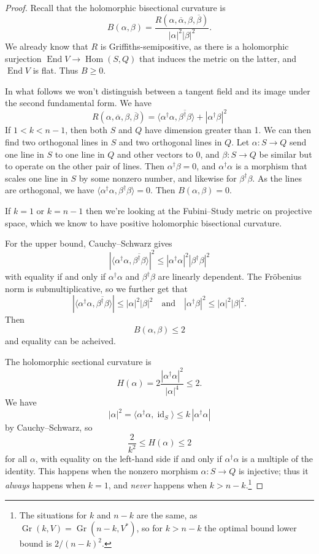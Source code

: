 \documentclass[10pt,a4paper]{article}
\newtheorem*{proof}{Proof}
\def\qandq{\quad\text{and}\quad}
\def\ov#1{\overline{#1}}
\DeclareMathOperator{\Gr}{Gr}
\DeclareMathOperator{\End}{End}
\DeclareMathOperator{\Hom}{Hom}
\DeclareMathOperator{\id}{id}
\begin{document}
\begin{proof}
Recall that the holomorphic bisectional curvature is
\[
B(\alpha,\beta)
= \frac{R(\alpha,\ov\alpha,\beta,\ov\beta)}{|\alpha|^2|\beta|^2}.
\]
We already know that $R$ is Griffiths-semipositive, as there is a holomorphic surjection $\End V \to \Hom(S,Q)$ that induces the metric on the latter, and $\End V$ is flat. Thus $B \geq 0$.

In what follows we won't distinguish between a tangent field and its image under the second fundamental form.
We have
\[
R(\alpha,\ov\alpha,\beta,\ov\beta)
= \langle \alpha^\dagger \alpha, \ov{\beta^\dagger \beta} \rangle
+ |\alpha^\dagger \beta|^2
\]
If $1 < k < n-1$, then both $S$ and $Q$ have dimension greater than 1.
We can then find two orthogonal lines in $S$ and two orthogonal lines
in $Q$. Let $\alpha : S \to Q$ send one line in $S$ to one line in $Q$
and other vectors to 0, and $\beta : S \to Q$ be similar but to
operate on the other pair of lines.
Then $\alpha^\dagger \beta = 0$, and $\alpha^\dagger \alpha$ is a morphism that scales one line in $S$ by some nonzero number, and likewise for $\beta^\dagger \beta$. As the lines are orthogonal, we have $\langle \alpha^\dagger \alpha, \beta^\dagger \beta \rangle = 0$. Then $B(\alpha,\beta) = 0$.

If $k = 1$ or $k = n-1$ then we're looking at the Fubini--Study metric on projective space, which we know to have positive holomorphic bisectional curvature.

For the upper bound,
Cauchy--Schwarz gives
\[
|\langle \alpha^\dagger \alpha, \ov{\beta^\dagger \beta} \rangle|^2
\leq
|\alpha^\dagger \alpha|^2 |\beta^\dagger \beta|^2
\]
with equality if and only if $\alpha^\dagger\alpha$ and $\beta^\dagger\beta$ are linearly dependent.
The Fr\"obenius norm is submultiplicative, so we further get that
\[
|\langle \alpha^\dagger \alpha, \ov{\beta^\dagger \beta} \rangle|
\leq |\alpha|^2 |\beta|^2
\qandq
|\alpha^\dagger \beta|^2
\leq |\alpha|^2 |\beta|^2.
\]
Then
\[
B(\alpha,\beta) \leq 2
\]
and equality can be acheived.

The holomorphic sectional curvature is
\[
H(\alpha) = 2 \frac{|\alpha^\dagger \alpha|^2}{|\alpha|^4} \leq 2.
\]
We have
\[
|\alpha|^2
= \langle \alpha^\dagger \alpha, \id_S \rangle
\leq k \, |\alpha^\dagger \alpha|
\]
by Cauchy--Schwarz, so
\[
\frac{2}{k^2} \leq H(\alpha) \leq 2
\]
for all $\alpha$, with equality on the left-hand side if and only if
$\alpha^\dagger \alpha$ is a multiple of the identity. This happens
when the nonzero morphism $\alpha : S \to Q$ is injective; thus it \emph{always} happens when $k = 1$, and \emph{never} happens when $k > n-k$.\footnote{The situations for $k$ and $n-k$ are the same, as $\Gr(k,V) = \Gr(n-k,V^*)$, so for $k > n-k$ the optimal bound lower bound is $2/(n-k)^2$.}



\end{proof}
\end{document}

